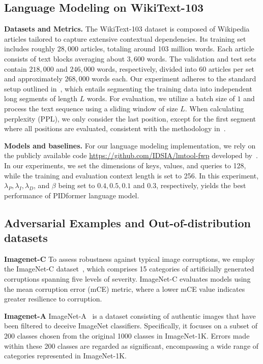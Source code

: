\subsection{Language Modeling on WikiText-103}
\textbf{Datasets and Metrics.} 
The WikiText-103 dataset is composed of Wikipedia articles tailored to capture extensive contextual dependencies. Its training set includes roughly $28,000$ articles, totaling around 103 million words. Each article consists of text blocks averaging about $3,600$ words. The validation and test sets contain $218,000$ and $246,000$ words, respectively, divided into 60 articles per set and approximately $268,000$ words each. Our experiment adheres to the standard setup outlined in~\cite{DBLP:conf/iclr/MerityX0S17, schlag2021linear}, which entails segmenting the training data into independent long segments of length $L$ words. For evaluation, we utilize a batch size of $1$ and process the text sequence using a sliding window of size $L$. When calculating perplexity (PPL), we only consider the last position, except for the first segment where all positions are evaluated, consistent with the methodology in~\cite{al2019character, schlag2021linear}.

\textbf{Models and baselines.} For our language modeling implementation, we rely on the publicly available code \textcolor{blue}{\href{https://github.com/IDSIA/lmtool-fwp}{https://github.com/IDSIA/lmtool-fwp}} developed by~\cite{schlag2021linear}. In our experiments, we set the dimensions of keys, values, and queries to 128, while the training and evaluation context length is set to 256. In this experiment, $\lambda_P, \lambda_I, \lambda_D$, and $\beta$ being set to $0.4, 0.5, 0.1$ and $0.3$, respectively, yields the best performance of PIDformer language model.
\subsection{Adversarial Examples and  Out-of-distribution datasets}
\textbf{Imagenet-C} To assess robustness against typical image corruptions, we employ the ImageNet-C dataset~\cite{hendrycks2019benchmarking}, which comprises 15 categories of artificially generated corruptions spanning five levels of severity. ImageNet-C evaluates models using the mean corruption error (mCE) metric, where a lower mCE value indicates greater resilience to corruption.

\textbf{Imagenet-A} ImageNet-A~\cite{hendrycks2021natural} is a dataset consisting of authentic images that have been filtered to deceive ImageNet classifiers. Specifically, it focuses on a subset of 200 classes chosen from the original 1000 classes in ImageNet-1K. Errors made within these 200 classes are regarded as significant, encompassing a wide range of categories represented in ImageNet-1K.

